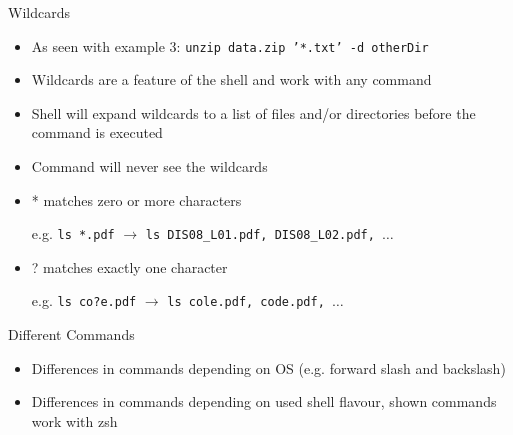 \documentclass[hyperref={pdfpagelabels=false},aspectratio=169]{beamer}
\begin{document}
\begin{frame}{Wildcards}

    \begin{itemize}
        \item As seen with example 3: \texttt{unzip data.zip '}\textcolor{THorange}{\texttt{*}}\texttt{.txt' -d otherDir}
        \item Wildcards are a feature of the shell and work with any command
        \item Shell will expand wildcards to a list of files and/or directories before the command is executed
        \item Command will never see the wildcards
        \item \textcolor{THviolett}{*} matches zero or more characters
        
        e.g. \texttt{ls *.pdf} $\rightarrow$  \texttt{ls DIS08\_L01.pdf, DIS08\_L02.pdf, $\dots$}
        \item \textcolor{THviolett}{?} matches exactly one character
        
        e.g. \texttt{ls co?e.pdf} $\rightarrow$  \texttt{ls cole.pdf, code.pdf, $\dots$}
    \end{itemize}
    
\end{frame} 

\begin{frame}{Different Commands}
    
    \begin{itemize}
        \item Differences in commands depending on OS (e.g. forward slash and backslash)
        \item Differences in commands depending on used shell flavour, shown commands work with zsh
    \end{itemize}
    
\end{frame}
\end{document}
